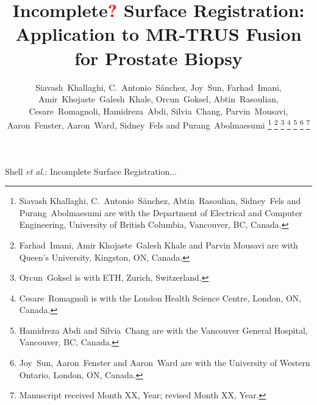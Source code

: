 \documentclass[journal]{IEEEtran}
\newcommand{\comment}[1]{\textcolor{red}{#1}}
\begin{document}
\title{Incomplete\comment{?} Surface Registration: Application to MR-TRUS Fusion for Prostate Biopsy}

\author{Siavash~Khallaghi, C.~Antonio~S\'anchez, Joy~Sun, Farhad~Imani, Amir~Khojaste~Galesh~Khale, Orcun~Goksel, Abtin~Rasoulian, Cesare~Romagnoli, Hamidreza~Abdi, Silvia~Chang, Parvin~Mousavi, Aaron~Fenster, Aaron~Ward, Sidney~Fels and Purang~Abolmaesumi%
\thanks{Siavash Khallaghi, C.~Antonio~S\'anchez, Abtin~Rasoulian, Sidney~Fels and Purang~Abolmaesumi are with the Department of Electrical and Computer Engineering, University of British Columbia, Vancouver, BC, Canada.}%
\thanks{Farhad~Imani, Amir Khojaste~Galesh Khale and Parvin Mousavi are with Queen's University, Kingston, ON, Canada.}
\thanks{Orcun~Goksel is with ETH, Zurich, Switzerland.}
\thanks{Cesare~Romagnoli is with the London Health Science Centre, London, ON, Canada.}%
\thanks{Hamidreza Abdi and Silvia~Chang are with the Vancouver General Hospital, Vancouver, BC, Canada.}%
\thanks{Joy~Sun, Aaron~Fenster and Aaron~Ward are with the University of Western Ontario, London, ON, Canada.}%
\thanks{Manuscript received Month XX, Year; revised Month XX, Year.}}

%
{Shell \MakeLowercase{\textit{et al.}}: Incomplete Surface Registration...}

\maketitle
\end{document}
